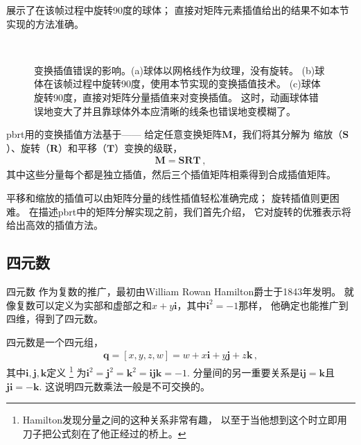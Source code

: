 展示了在该帧过程中旋转90度的球体；
直接对矩阵元素插值给出的结果不如本节实现的方法准确。
\begin{figure}[htb]
    \raggedright
    \\%
    \quad%
    \begin{minipage}{0.45\textwidth}
        \vspace{-\linewidth}\caption{变换插值错误的影响。(a)球体以网格线作为纹理，没有旋转。
            (b)球体在该帧过程中旋转90度，使用本节实现的变换插值技术。
            (c)球体旋转90度，直接对矩阵分量插值来对变换插值。
            这时，动画球体错误地变大了并且靠球体外本应清晰的线条也错误地变模糊了。}
        \label{fig:2.16}
    \end{minipage}
\end{figure}

pbrt用的变换插值方法基于——
给定任意变换矩阵$\bm M$，我们将其分解为
缩放（$\bm S$）、旋转（$\bm R$）和平移（$\bm T$）变换的级联，
\begin{align*}
    \bm M=\bm S\bm R\bm T\, ,
\end{align*}
其中这些分量每个都是独立插值，然后三个插值矩阵相乘得到合成插值矩阵。

平移和缩放的插值可以由矩阵分量的线性插值轻松准确完成；
旋转插值则更困难。
在描述pbrt中的矩阵分解实现之前，我们首先介绍，
它对旋转的优雅表示将给出高效的插值方法。

\subsection{四元数}\label{sub:四元数}
四元数
作为复数的推广，最初由William Rowan Hamilton爵士于1843年发明。
就像复数可以定义为实部和虚部之和$x+y\mathbf{i}$，其中$\mathbf{i}^2=-1$那样，
他确定也能推广到四维，得到了四元数。

四元数是一个四元组，
\begin{align}\label{eq:2.4}
    \bm q=[x,y,z,w]=w+x\mathbf{i}+y\mathbf{j}+z\mathbf{k}\, ,
\end{align}
其中$\mathbf{i}, \mathbf{j}, \mathbf{k}$定义
\footnote{Hamilton发现分量之间的这种关系非常有趣，
    以至于当他想到这个时立即用刀子把公式刻在了他正经过的桥上。}
为$\mathbf{i}^2=\mathbf{j}^2=\mathbf{k}^2=\mathbf{i}\mathbf{j}\mathbf{k}=-1$.
分量间的另一重要关系是$\mathbf{i}\mathbf{j}=\mathbf{k}$且
$\mathbf{j}\mathbf{i}=-\mathbf{k}$.
这说明四元数乘法一般是不可交换的。

